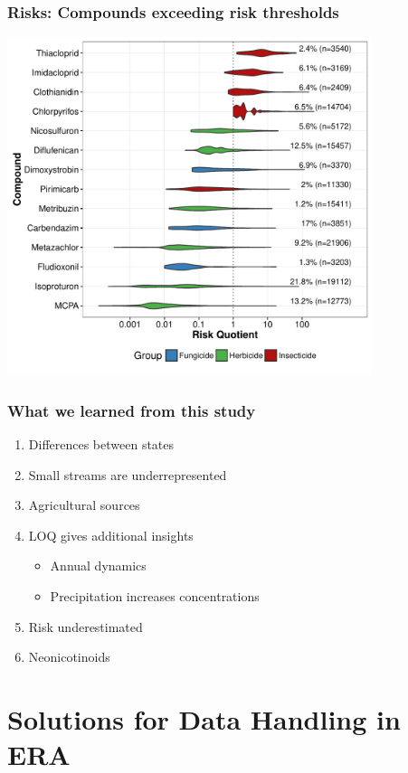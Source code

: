 \documentclass[
	10pt
	]{beamer}
\begin{document}
\begin{frame}
\frametitle{Risks: Compounds exceeding risk thresholds}
	\includegraphics[width = 0.8\textwidth]{figs/compounds.pdf}
\end{frame}


\begin{frame}
\frametitle{What we learned from this study}
	\begin{enumerate}
		\item Differences between \alert{states}
		\item Small streams are \alert{underrepresented}
		\item \alert{Agricultural} sources
		\item \alert{LOQ} gives additional insights
			\begin{itemize}
				\item Annual \alert{dynamics}
				\item \alert{Precipitation} increases concentrations
			\end{itemize}
		\item Risk \alert{underestimated} 
		\item \alert{Neonicotinoids} 
	\end{enumerate}
\end{frame}



\section{Solutions for Data Handling in ERA}
\end{document}

